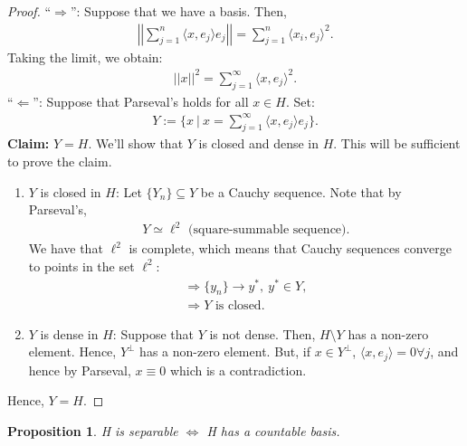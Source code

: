 \documentclass[psamsfonts]{amsart}
\newcommand{\given}{\ |\ }
\newtheorem{prop}[thm]{Proposition}
\theoremstyle{definition}
\theoremstyle{remark}
\newcommand{\norm}[1]{	\left| \left| #1 \right| \right| }
\numberwithin{equation}{section}
\begin{document}
\begin{proof}
``\( \Rightarrow \)'': Suppose that we have a basis. Then, 
\begin{align*}
	\norm{\sum_{j=1}^n \langle x, e_j \rangle e_j} = \sum_{j=1}^n \langle x_i, e_j \rangle^2.
\end{align*}
Taking the limit, we obtain: 
\begin{align*}
	\norm{x}^2 = \sum_{j=1}^\infty \langle x, e_j \rangle^2.
\end{align*}
``\(\Leftarrow \)'': Suppose that Parseval's holds for all \( x \in H \). Set:
\begin{align*}
	Y := \{ x \given x = \sum_{j=1}^\infty \langle x, e_j \rangle e_j \}.
\end{align*}
\textbf{Claim:} \( Y = H \). We'll show that \( Y \) is closed and dense in \( H \). This will be sufficient to prove the claim. 
\begin{enumerate}
	\item \( Y \) is closed in \( H \): Let \( \{ Y_n \} \subseteq Y \) be a Cauchy sequence. Note that by Parseval's, 
	\begin{align*}
		Y \simeq \ell^2 \text{ (square-summable sequence)}.
	\end{align*}
	We have that \( \ell^2 \) is complete, which means that Cauchy sequences converge to points in the set \( \ell^2 \):
	\begin{align*}
		\Rightarrow \{ y_n \} \rightarrow y^*,\ y^* \in Y, \\
		\Rightarrow Y \text{ is closed.} 
	\end{align*}
	\item \( Y \) is dense in \( H \): Suppose that \( Y \) is not dense. Then, \( H \setminus Y \) has a non-zero element. Hence, \( Y^\perp \) has a non-zero element. But, if \( x \in Y^\perp \), \( \langle x, e_j \rangle = 0 \forall j \), and hence by Parseval, \( x \equiv 0 \) which is a contradiction. 
\end{enumerate}
Hence, \( Y = H \).
\end{proof}


\begin{prop}
	H is separable \( \iff \) H has a countable basis. 
\end{prop}
\end{document}
